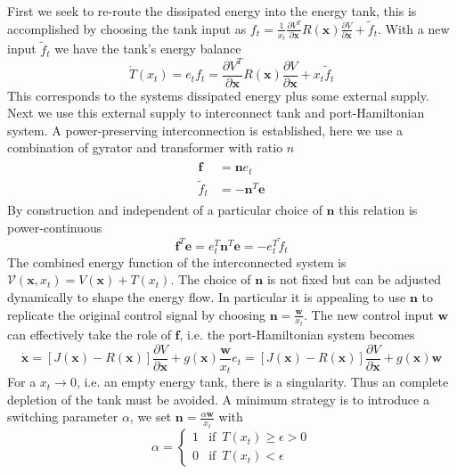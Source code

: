 \documentclass[a4paper,twoside, openright,12pt]{report}
\newcommand{\f}[1]{\boldsymbol{#1}}
\begin{document}
First we seek to re-route the dissipated energy into the energy tank, this is accomplished by choosing the tank input as $f_t = \frac{1}{x_t}\frac{\partial V^T}{\partial \f{x}}R(\f{x})\frac{\partial V}{\partial \f{x}} + \tilde{f}_t$. With a new input $\tilde{f}_t$ we have the tank's energy balance
\begin{equation}\label{EQ:tankpower}
\dot{T}(x_t)=e_tf_t = \frac{\partial V^T}{\partial \f{x}}R(\f{x})\frac{\partial V}{\partial \f{x}} + x_t\tilde{f}_t
\end{equation}
This corresponds to the systems dissipated energy plus some external supply. Next we use this external supply to interconnect tank and port-Hamiltonian system. A power-preserving interconnection is established, here we use a combination of gyrator and transformer with ratio $n$
\begin{eqnarray}
\begin{aligned}
\f{f} &= \f{n}e_t \\
\tilde{f}_t &= -\f{n}^T\f{e}
\end{aligned}
\end{eqnarray}
By construction and independent of a particular choice of $\f{n}$ this relation is power-continuous
\begin{equation}
\f{f}^T\f{e} = e_t^T\f{n}^T\f{e} = -e_t^T\tilde{f}_t
\end{equation}
The combined energy function of the interconnected system is $\mathcal{V}(\f{x},x_t)=V(\f{x})+T(x_t)$. The choice of $\f{n}$ is not fixed but can be adjusted dynamically to shape the energy flow. In particular it is appealing to use $\f{n}$ to replicate the original control signal by choosing $\f{n} = \frac{\f{w}}{x_t}$. The new control input $\f{w}$ can effectively take the role of $\f{f}$, i.e. the port-Hamiltonian system becomes
\begin{equation}
\dot{\f{x}} = [J(\f{x}) - R(\f{x})] \frac{\partial V}{\partial \f{x}} + g(\f{x})\frac{\f{w}}{x_t}e_t = [J(\f{x}) - R(\f{x})] \frac{\partial V}{\partial \f{x}} + g(\f{x})\f{w}
\end{equation}
For a $x_t\rightarrow0$, i.e. an empty energy tank, there is a singularity. Thus an complete depletion of the tank must be avoided. A minimum strategy is to introduce a switching parameter $\alpha$, we set $\f{n}=\frac{\alpha \f{w}}{x_t}$ with 
\begin{equation}
\alpha = \begin{cases}
1 & \text{if } \, T(x_t)\geq\epsilon>0 \\
0 & \text{if } \, T(x_t) < \epsilon
\end{cases}
\end{equation}
\end{document}
